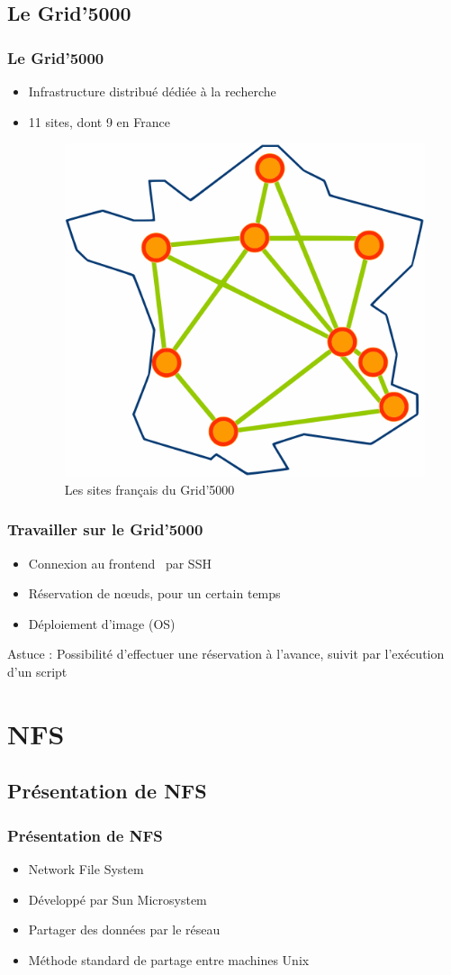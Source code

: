 \documentclass[blue]{beamer}
\begin{document}
	\subsection{Le Grid'5000}
	\begin{frame}
		\frametitle{Le Grid'5000}
		\begin{itemize}
			\item Infrastructure distribué dédiée à la recherche
			\item 11 sites, dont 9 en France
			\begin{figure}
				\includegraphics[width=0.3\linewidth]{../images/Site_map.png}
				\caption{Les sites français du Grid'5000}
			\end{figure}
		\end{itemize}
	\end{frame}

	\begin{frame}
		\frametitle{Travailler sur le Grid'5000}
		\begin{itemize}
			\item Connexion au \og frontend\fg~ par SSH
			\item Réservation de nœuds, pour un certain temps
			\item Déploiement d'image (OS)
		\end{itemize}

		\begin{block}{Astuce :}
			Possibilité d'effectuer une réservation à l'avance, suivit par l'exécution d'un script
		\end{block}
	\end{frame}

\section{NFS}
  \subsection{Présentation de NFS}
\begin{frame}
  \frametitle{Présentation de NFS}
  \begin{itemize}
    \item Network File System
    \item Développé par Sun Microsystem
    \item Partager des données par le réseau
    \item Méthode standard de partage entre machines Unix
  \end{itemize}
\end{frame}
\end{document}
